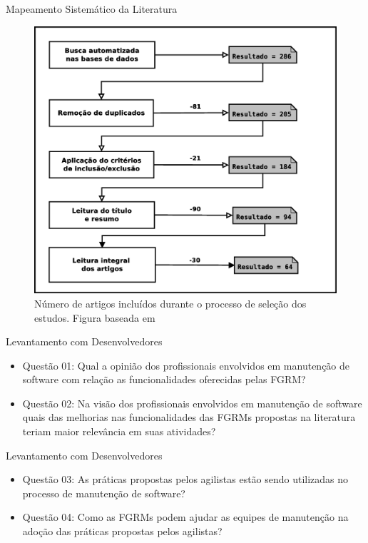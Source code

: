 \documentclass[t,14pt,mathserif]{beamer}
\begin{document}
\begin{frame}{Mapeamento Sistemático da Literatura}

            \begin{figure} \centering \includegraphics[width=0.45\linewidth]
        {../img/diagrama-processo-selecao.eps}
        \caption{Número de artigos incluídos durante o processo de seleção dos
            estudos. Figura baseada em~\cite{Petersen2015}}
\label{fig:diagrama-processo-selecao}

    \end{figure}
\end{frame}

\begin{frame}{Levantamento com Desenvolvedores}

    \begin{itemize}
        \item Questão 01: Qual a opinião dos profissionais envolvidos em
            manutenção de software com relação as funcionalidades
            oferecidas pelas FGRM\@?
        \item Questão 02: Na visão dos profissionais envolvidos em
            manutenção de software quais das melhorias nas
            funcionalidades das FGRMs propostas na literatura teriam
            maior relevância em suas atividades?
    \end{itemize}

\end{frame}

\begin{frame}{Levantamento com Desenvolvedores}

    \begin{itemize}
        \item Questão 03: As práticas propostas pelos agilistas estão
            sendo utilizadas no processo de manutenção de software?
        \item Questão 04: Como as FGRMs podem ajudar as equipes de
            manutenção na adoção das práticas propostas pelos agilistas?
    \end{itemize}

\end{frame}
\end{document}
